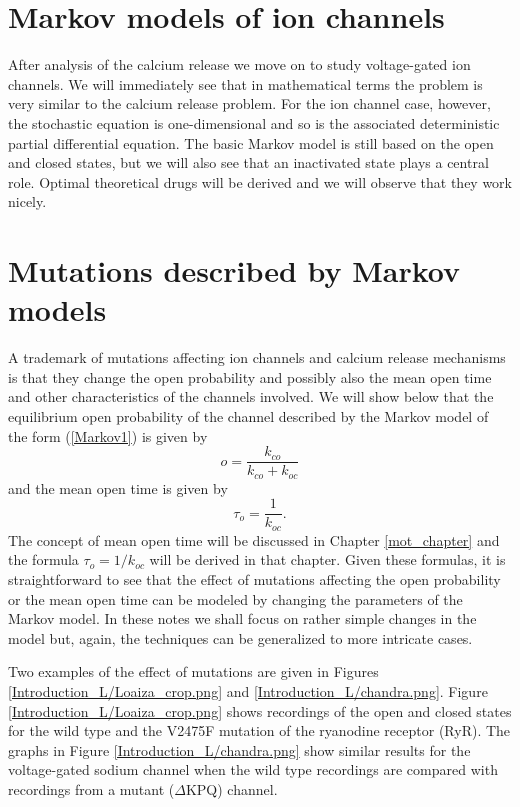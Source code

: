  \section{Markov models of ion channels}
 
After analysis of the calcium release we move on to study voltage-gated  ion channels. We will immediately see that in mathematical terms the problem is very similar to the calcium release problem. For the ion channel case, however, the stochastic equation is one-dimensional and so is the associated deterministic partial differential equation. The basic Markov model is still based on the open and closed states, but we will also see that an inactivated state plays a central role. Optimal theoretical drugs will be derived and we will observe that they work nicely.

\section{Mutations described by Markov models}

A trademark of mutations affecting ion channels and calcium release mechanisms is that they change the open probability and possibly also the mean open time and other characteristics of the channels involved. We will show below that the equilibrium open probability of the channel described by the Markov model of the form (\ref{Markov1}) is given by 
\[ o=\frac{k_{co}}{k_{co}+k_{oc}} \]
and the mean open time is given by
\[ \tau_o=\frac{1}{k_{oc}}. \]
The concept of mean open time will be discussed in Chapter \ref{mot_chapter} and the formula $\tau_o=1/k_{oc}$ will be derived in that chapter.
 Given these formulas, it is straightforward to see that the effect of mutations affecting the open probability or the mean open time can be modeled by changing the parameters of the Markov model. In these notes we shall focus on rather simple changes 
 in the model but, again, the techniques can be generalized to more intricate cases.
 
  Two examples of the effect of mutations are given in Figures 
 \ref{Introduction_L/Loaiza_crop.png}  and \ref{Introduction_L/chandra.png}. Figure
 \ref{Introduction_L/Loaiza_crop.png}  shows recordings of the open and closed states for the wild type and the 
  V2475F mutation of the ryanodine receptor (RyR).
  The graphs in Figure \ref{Introduction_L/chandra.png} show similar results for the voltage-gated sodium channel when the wild type recordings are compared with recordings from a mutant ($\Delta$KPQ) channel.


